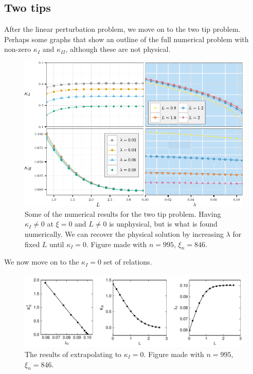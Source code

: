 \documentclass{jfm}
\begin{document}
\subsection{Two tips}
After the linear perturbation problem, we move on to the two tip
problem. Perhaps some graphs that show an outline of the full numerical problem
with non-zero $\kappa_I$ and $\kappa_{II}$, although these are not physical.
\begin{figure}
 \centerline{
\includegraphics{./../../Graphs/KI-KII-edited.pdf}}
  \caption{Some of the numerical results for the two tip problem. Having 
           $\kappa_{I} \neq 0$ at $\xi =0$ and $L \neq 0$ is unphysical, but
           is what is found numerically. We can recover the physical solution
           by increasing $\lambda$ for fixed $L$ until $\kappa_I =0$. Figure 
           made with $n = 995$, $\xi_n = 846$.}
\end{figure}

We now move on to the $\kappa_I=0$ set of relations.
\begin{figure}
 \centerline{
\includegraphics{./../../Graphs/KI-0.pdf}}
  \caption{The results of extrapolating to $\kappa_I = 0$. Figure 
           made with $n = 995$, $\xi_n = 846$.}
\end{figure}
\end{document}
